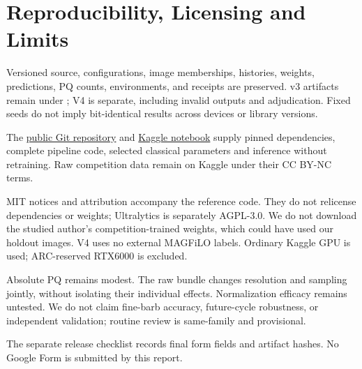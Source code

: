 \documentclass[sigconf]{acmart}
\begin{document}
\section{Reproducibility, Licensing and Limits}
Versioned source, configurations, image memberships, histories, weights, predictions, PQ counts, environments, and receipts are preserved. v3 artifacts remain under ; V4 is separate, including invalid outputs and adjudication. Fixed seeds do not imply bit-identical results across devices or library versions.

The \href{https://github.com/mengxinlab/solar-filament-2026-reproducible}{public Git repository} and \href{https://www.kaggle.com/code/mengxinlab/solar-filament-2026-reproducible-release}{Kaggle notebook} supply pinned dependencies, complete pipeline code, selected classical parameters and inference without retraining. Raw competition data remain on Kaggle under their CC BY-NC terms.

MIT notices and attribution accompany the reference code. They do not relicense dependencies or weights; Ultralytics is separately AGPL-3.0. We do not download the studied author's competition-trained weights, which could have used our holdout images. V4 uses no external MAGFiLO labels. Ordinary Kaggle GPU is used; ARC-reserved RTX6000 is excluded.

Absolute PQ remains modest. The raw bundle changes resolution and sampling jointly, without isolating their individual effects. Normalization efficacy remains untested. We do not claim fine-barb accuracy, future-cycle robustness, or independent validation; routine review is same-family and provisional.

The separate release checklist records final form fields and artifact hashes. No Google Form is submitted by this report.



\end{document}
